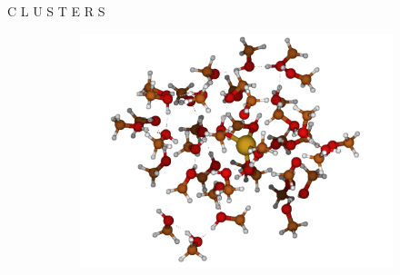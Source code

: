 \documentclass[final]{beamer}
\newlength{\colwidth}
\begin{document}
\begin{frame}[t]
\begin{columns}[t]
\begin{column}{\colwidth}
\begin{alertblock}{C L U S T E R S}
\begin{figure}[H]
\begin{subfigure}[b]{0.27\textwidth}
						\caption{}
						\label{fig:cu-30ch4o}
					\end{subfigure}%
					\hfill
					\begin{subfigure}[b]{0.27\textwidth}
						\centering
						\includegraphics[width=\textwidth]{logos/Cu-40CH4O.png}
						\caption{}
						\label{fig:cu-40ch4o}
					\end{subfigure}
					
					\vspace{1em} %
					

\end{figure}
\end{alertblock}
\end{column}
\end{columns}
\end{frame}
\end{document}
